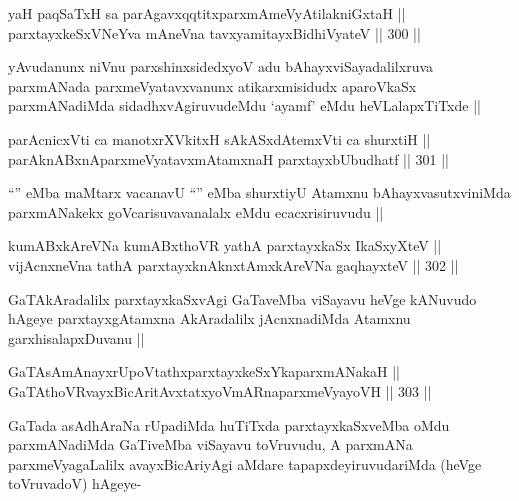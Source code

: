 
\begin{shl}
yaH paqSaTxH sa parAgavxqqtitxparxmAmeVyAtilakniGxtaH || \\
parxtayxkeSxVNeYva mAneVna tavxyamitayxBidhiVyateV ||  300 ||  
\end{shl}

\begin{artha}
yAvudanunx niVnu parxshinxsidedxyoV adu bAhayxviSayadalilxruva parxmANada parxmeVyatavxvanunx atikarxmisidudx aparoVkaSx parxmANadiMda sidadhxvAgiruvudeMdu `ayamf' eMdu heVLalapxTiTxde ||
\end{artha}


\begin{shl}
parAcnicxVti ca manotxrXVkitxH sAkASxdAtemxVti ca shurxtiH || \\
parAknABxnAparxmeVyatavxmAtamxnaH parxtayxbUbudhatf ||  301 ||  
\end{shl}

\begin{artha}
``\stext'' eMba maMtarx vacanavU ``\stext'' eMba shurxtiyU Atamxnu bAhayxvasutxviniMda parxmANakekx goVcarisuvavanalalx eMdu ecacxrisiruvudu ||
\end{artha}

\begin{shl}
kumABxkAreVNa kumABxthoVR yathA parxtayxkaSx IkaSxyXteV || \\
vijAcnxneVna tathA parxtayxknAknxtAmxkAreVNa gaqhayxteV ||  302 ||  
\end{shl}

\begin{artha}
GaTAkAradalilx parxtayxkaSxvAgi GaTaveMba viSayavu heVge kANuvudo hAgeye parxtayxgAtamxna AkAradalilx jAcnxnadiMda Atamxnu garxhisalapxDuvanu ||
\end{artha}


\begin{shl}
GaTAsAmAnayxrUpoVtathxparxtayxkeSxYkaparxmANakaH || \\
GaTAthoVR\s vayxBicAritAvxtatxyoVmARnaparxmeVyayoVH ||  303 ||  
\end{shl}

\begin{artha}
GaTada asAdhAraNa rUpadiMda huTiTxda parxtayxkaSxveMba oMdu parxmANadiMda GaTiveMba viSayavu toVruvudu, A parxmANa parxmeVyagaLalilx avayxBicAriyAgi aMdare tapapxdeyiruvudariMda (heVge toVruvadoV) hAgeye-
\end{artha}

